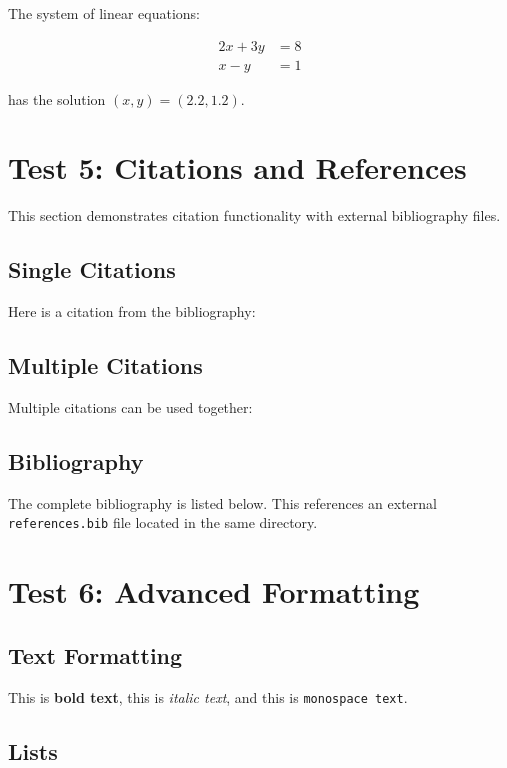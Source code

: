 \documentclass[12pt]{article}
\begin{document}
The system of linear equations:

\begin{align}
    2x + 3y &= 8 \\
    x - y &= 1
\end{align}

has the solution $(x, y) = (2.2, 1.2)$.

\section{Test 5: Citations and References}

This section demonstrates citation functionality with external bibliography files.

\subsection{Single Citations}

Here is a citation from the bibliography: \cite{smith2020}

\subsection{Multiple Citations}

Multiple citations can be used together: \cite{smith2020, doe2018}

\subsection{Bibliography}

The complete bibliography is listed below. This references an external \texttt{references.bib} file located in the same directory.




\newpage

\section{Test 6: Advanced Formatting}

\subsection{Text Formatting}

This is \textbf{bold text}, this is \textit{italic text}, and this is \texttt{monospace text}.

\subsection{Lists}
\end{document}

